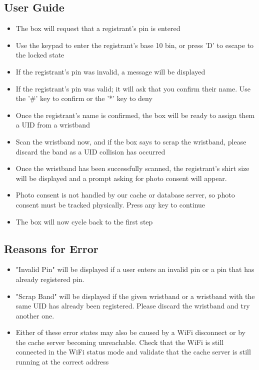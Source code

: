 \documentclass{article}
\begin{document}
\subsection{User Guide}
\begin{itemize}
	\item The box will request that a registrant's pin is entered
	\item Use the keypad to enter the registrant's base 10 bin, or press 'D' to escape to the locked state
	\item If the registrant's pin was invalid, a message will be displayed
	\item If the registrant's pin was valid; it will ask that you confirm their name.  Use the '\#' key to confirm or the '*' key to deny
	\item Once the registrant's name is confirmed, the box will be ready to assign them a UID from a wristband
	\item Scan the wristband now, and if the box says to scrap the wristband, please discard the band as a UID collision has occurred
	\item Once the wristband has been successfully scanned, the registrant's shirt size will be displayed and a prompt asking for photo consent will appear.
	\item Photo consent is not handled by our cache or database server, so photo consent must be tracked physically.  Press any key to continue
	\item The box will now cycle back to the first step
\end{itemize}
\subsection{Reasons for Error}
\begin{itemize}
	\item "Invalid Pin" will be displayed if a user enters an invalid pin or a pin that has already registered pin.
	\item "Scrap Band" will be displayed if the given wristband or a wristband with the same UID has already been registered.  Please discard the wristband and try another one.
	\item Either of these error states may also be caused by a WiFi disconnect or by the cache server becoming unreachable.  Check that the WiFi is still connected in the WiFi status mode and validate that the cache server is still running at the correct address
\end{itemize}
\end{document}
